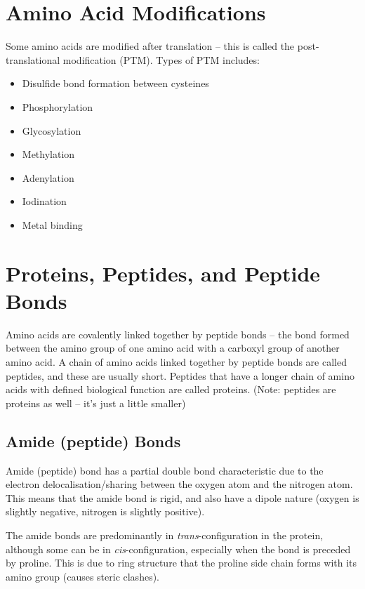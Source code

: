 \documentclass[a4paper, 12pt]{report}
\begin{document}
\section{Amino Acid Modifications}

Some amino acids are modified after translation -- this is called the post-translational modification (PTM).
Types of PTM includes:
\begin{itemize}
    \item Disulfide bond formation between cysteines
    \item Phosphorylation
    \item Glycosylation
    \item Methylation
    \item Adenylation
    \item Iodination
    \item Metal binding
\end{itemize}

\section{Proteins, Peptides, and Peptide Bonds}

Amino acids are covalently linked together by peptide bonds -- the bond formed between the amino group of one amino acid with a carboxyl group of another amino acid.
A chain of amino acids linked together by peptide bonds are called peptides, and these are usually short.
Peptides that have a longer chain of amino acids with defined biological function are called proteins.
(Note: peptides are proteins as well -- it's just a little smaller)

\subsection{Amide (peptide) Bonds}

Amide (peptide) bond has a partial double bond characteristic due to the electron delocalisation/sharing between the oxygen atom and the nitrogen atom.
This means that the amide bond is rigid, and also have a dipole nature (oxygen is slightly negative, nitrogen is slightly positive).

The amide bonds are predominantly in \textit{trans}-configuration in the protein, although some can be in \textit{cis}-configuration, especially when the bond is preceded by proline.
This is due to ring structure that the proline side chain forms with its amino group (causes steric clashes).
\end{document}
